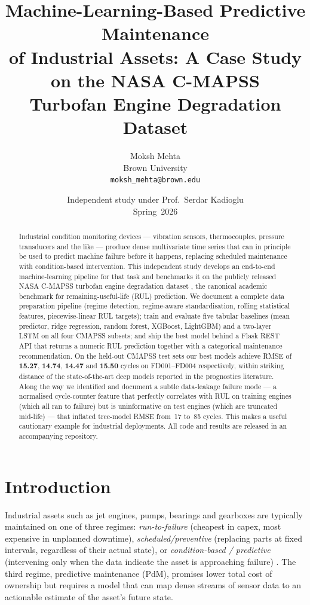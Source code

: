 \documentclass[11pt,letterpaper]{article}
\title{\bfseries Machine-Learning-Based Predictive Maintenance \\
  of Industrial Assets: A Case Study on the NASA C-MAPSS \\
  Turbofan Engine Degradation Dataset}
\author{Moksh Mehta \\ \small Brown University \\ \small \texttt{moksh\_mehta@brown.edu}}
\affil{}
\date{Independent study under Prof.~Serdar Kadioglu \\ Spring~2026}
\begin{document}
\maketitle

\begin{abstract}
\noindent Industrial condition monitoring devices --- vibration sensors,
thermocouples, pressure transducers and the like --- produce dense
multivariate time series that can in principle be used to predict
machine failure before it happens, replacing scheduled maintenance with
condition-based intervention. This independent study develops an
end-to-end machine-learning pipeline for that task and benchmarks it on
the publicly released NASA C-MAPSS turbofan engine degradation dataset
\citep{saxena2008cmapss}, the canonical academic benchmark for
remaining-useful-life (RUL) prediction. We document a complete data
preparation pipeline (regime detection, regime-aware standardisation,
rolling statistical features, piecewise-linear RUL targets); train and
evaluate five tabular baselines (mean predictor, ridge regression,
random forest, XGBoost, LightGBM) and a two-layer LSTM on all four
CMAPSS subsets; and ship the best model behind a Flask REST API that
returns a numeric RUL prediction together with a categorical maintenance
recommendation. On the held-out CMAPSS test sets our best models achieve
RMSE of \textbf{15.27}, \textbf{14.74}, \textbf{14.47} and \textbf{15.50}
cycles on FD001--FD004 respectively, within striking distance of the
state-of-the-art deep models reported in the prognostics literature.
Along the way we identified and document a subtle data-leakage failure
mode --- a normalised cycle-counter feature that perfectly correlates
with RUL on training engines (which all ran to failure) but is
uninformative on test engines (which are truncated mid-life) --- that
inflated tree-model RMSE from~17 to~85 cycles. This makes a useful
cautionary example for industrial deployments. All code and results are
released in an accompanying repository.
\end{abstract}

\section{Introduction}
Industrial assets such as jet engines, pumps, bearings and gearboxes
are typically maintained on one of three regimes:
\emph{run-to-failure} (cheapest in capex, most expensive in unplanned
downtime), \emph{scheduled/preventive} (replacing parts at fixed
intervals, regardless of their actual state), or
\emph{condition-based / predictive} (intervening only when the data
indicate the asset is approaching failure)
\citep{lei2018machinery}. The third regime, predictive maintenance
(PdM), promises lower total cost of ownership but requires a model that
can map dense streams of sensor data to an actionable estimate of the
asset's future state.
\end{document}

